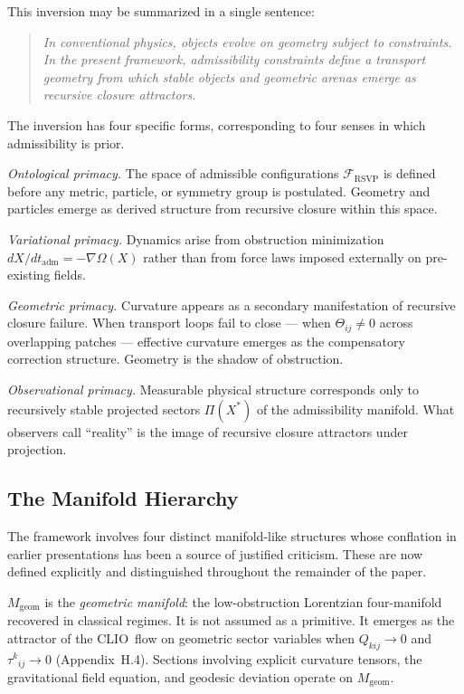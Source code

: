 \documentclass[12pt,a4paper]{article}
\newcommand{\RSVP}{\textrm{RSVP}}
\newcommand{\CLIO}{\textrm{CLIO}}
\newcommand{\Sheaf}{\mathcal{F}}
\begin{document}
This inversion may be summarized in a single sentence:

\begin{quote}
\textit{In conventional physics, objects evolve on geometry subject to
constraints. In the present framework, admissibility constraints define
a transport geometry from which stable objects and geometric arenas emerge
as recursive closure attractors.}
\end{quote}

The inversion has four specific forms, corresponding to four senses in which
admissibility is prior.

\textit{Ontological primacy.} The space of admissible configurations
$\Sheaf_\RSVP$ is defined before any metric, particle, or symmetry group is
postulated. Geometry and particles emerge as derived structure from recursive
closure within this space.

\textit{Variational primacy.} Dynamics arise from obstruction minimization
$dX/dt_\mathrm{adm}=-\nabla\Omega(X)$ rather than from force laws imposed
externally on pre-existing fields.

\textit{Geometric primacy.} Curvature appears as a secondary manifestation of
recursive closure failure. When transport loops fail to close --- when
$\Theta_{ij}\neq 0$ across overlapping patches --- effective curvature emerges
as the compensatory correction structure. Geometry is the shadow of obstruction.

\textit{Observational primacy.} Measurable physical structure corresponds only
to recursively stable projected sectors $\Pi(X^\ast)$ of the admissibility
manifold. What observers call ``reality'' is the image of recursive closure
attractors under projection.

\subsection{The Manifold Hierarchy}

The framework involves four distinct manifold-like structures whose conflation
in earlier presentations has been a source of justified criticism. These are
now defined explicitly and distinguished throughout the remainder of the paper.

$M_\mathrm{geom}$ is the \emph{geometric manifold}: the low-obstruction
Lorentzian four-manifold recovered in classical regimes. It is not assumed as a
primitive. It emerges as the attractor of the \CLIO\ flow on geometric sector
variables when $Q_{kij}\to 0$ and $\tau^k{}_{ij}\to 0$ (Appendix~H.4).
Sections involving explicit curvature tensors, the gravitational field equation,
and geodesic deviation operate on $M_\mathrm{geom}$.
\end{document}
